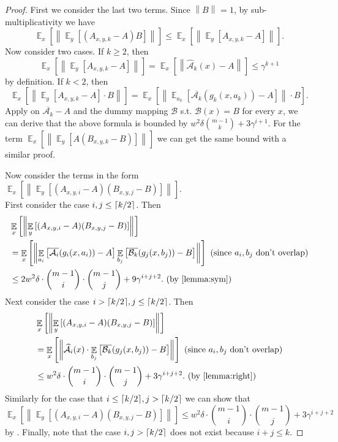 \documentclass[10pt,a4paper]{article}
\DeclareMathOperator*{\Ex}{\mathbb E}
\newcommand{\ex}[2][]{\Ex_{#1}\left[#2\right]}
\newcommand{\norm}[2][]{\left\|#2\right\|_{#1}}
\DeclarePairedDelimiter\ceil{\lceil}{\rceil}
\newcommand{\cA}{\mathcal A}
\newcommand{\cB}{\mathcal B}
\begin{document}
\begin{proof}
First we consider the last two terms. Since $\norm{B}=1$, by sub-multiplicativity we have 
$$\ex[x]{\norm{\ex[y]{(A_{x,y,k}-A)B}}}\le \ex[x]{\norm{\ex[y]{A_{x,y,k}-A}}}.$$
Now consider two cases. If $k\ge 2$, then 
$$\ex[x]{\norm{\ex[y]{A_{x,y,k}-A}}}=\ex[x]{\norm{\widehat{\cA}_k(x)-A}}\le \gamma^{k+1}$$ by definition. If $k<2$, then 
$$\ex[x]{\norm{\ex[y]{A_{x,y,k}-A}\cdot B}}=\ex[x]{\norm{\ex[a_k]{\overline{\cA_k}(g_k(x,a_k))-A}}\cdot B}.$$
Apply  on $\overline{\cA_k}-A$ and the dummy mapping $\cB$ s.t. $\cB(x)=B$ for every $x$, we can derive that the above formula is bounded by $w^2\delta\binom{m-1}{k}+3\gamma^{i+1}$. For the term $\ex[x]{\norm{\ex[y]{A(B_{x,y,k}-B)}}}$ we can get the same bound with a similar proof.

Now consider the terms in the form $\ex[x]{\norm{\ex[y]{(A_{x,y,i}-A)(B_{x,y,j}-B)}}}$. \\
First consider the case $i,j\le\ceil{k/2}$. Then
\begin{align*}
&\ex[x]{\norm{\ex[y]{(A_{x,y,i}-A)(B_{x,y,j}-B)}}}\\
&=\ex[x]{\norm{\ex[a_i]{\overline{\cA_i}(g_i(x,a_i))-A}\ex[b_j]{\overline{\cB_k}(g_j(x,b_j))-B}}}\textrm{ (since }a_i,b_j\textrm{ don't overlap)}\\
&\le 2w^2\delta \cdot \binom{m-1}{i}\cdot\binom{m-1}{j}+9\gamma^{i+j+2}.\textrm{ (by \Cref{lemma:sym})}
\end{align*}
Next consider the case $i>\ceil{k/2},j\le \ceil{k/2}$. Then 
\begin{align*}
&\ex[x]{\norm{\ex[y]{(A_{x,y,i}-A)(B_{x,y,j}-B)}}}\\
&=\ex[x]{\norm{\widehat{\cA}_i(x)\cdot\ex[b_j]{\overline{\cB_k}(g_j(x,b_j))-B}}}\textrm{ (since }a_i,b_j\textrm{ don't overlap)}\\
&\le w^2\delta \cdot \binom{m-1}{i}\cdot\binom{m-1}{j}+3\gamma^{i+j+2}.\textrm{ (by \Cref{lemma:right})}
\end{align*}
Similarly for the case that $i\le \ceil{k/2},j>\ceil{k/2}$ we can show that 
$$\ex[x]{\norm{\ex[y]{(A_{x,y,i}-A)(B_{x,y,j}-B)}}}\le w^2\delta \cdot \binom{m-1}{i}\cdot\binom{m-1}{j}+3\gamma^{i+j+2}$$
by . Finally, note that the case $i,j>\ceil{k/2}$ does not exist because $i+j\le k$. 


\end{proof}
\end{document}
